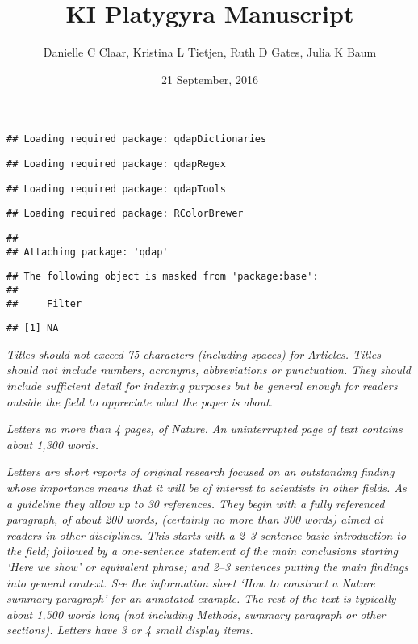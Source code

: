 \documentclass[]{article}
\title{KI Platygyra Manuscript}
\author{Danielle C Claar, Kristina L Tietjen, Ruth D Gates, Julia K Baum}
\date{21 September, 2016}
\begin{document}
\maketitle

\begin{verbatim}
## Loading required package: qdapDictionaries
\end{verbatim}

\begin{verbatim}
## Loading required package: qdapRegex
\end{verbatim}

\begin{verbatim}
## Loading required package: qdapTools
\end{verbatim}

\begin{verbatim}
## Loading required package: RColorBrewer
\end{verbatim}

\begin{verbatim}
## 
## Attaching package: 'qdap'
\end{verbatim}

\begin{verbatim}
## The following object is masked from 'package:base':
## 
##     Filter
\end{verbatim}

\begin{verbatim}
## [1] NA
\end{verbatim}

\emph{Titles should not exceed 75 characters (including spaces) for
Articles. Titles should not include numbers, acronyms, abbreviations or
punctuation. They should include sufficient detail for indexing purposes
but be general enough for readers outside the field to appreciate what
the paper is about.}

\emph{Letters no more than 4 pages, of Nature. An uninterrupted page of
text contains about 1,300 words.}

\emph{Letters are short reports of original research focused on an
outstanding finding whose importance means that it will be of interest
to scientists in other fields. As a guideline they allow up to 30
references. They begin with a fully referenced paragraph, of about 200
words, (certainly no more than 300 words) aimed at readers in other
disciplines. This starts with a 2--3 sentence basic introduction to the
field; followed by a one-sentence statement of the main conclusions
starting `Here we show' or equivalent phrase; and 2--3 sentences putting
the main findings into general context. See the information sheet `How
to construct a Nature summary paragraph' for an annotated example. The
rest of the text is typically about 1,500 words long (not including
Methods, summary paragraph or other sections). Letters have 3 or 4 small
display items.}
\end{document}
